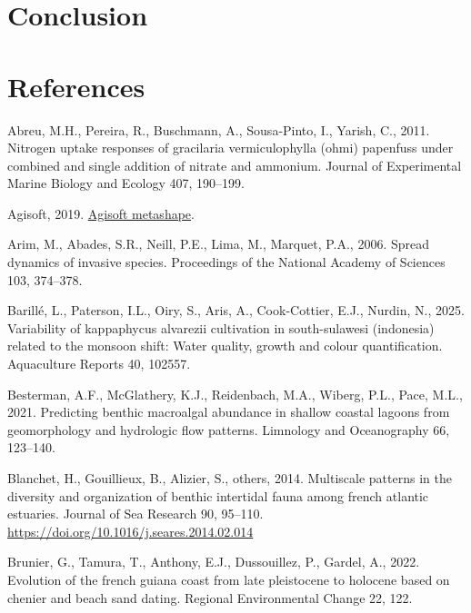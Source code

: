 \documentclass[
  letterpaper,
  DIV=11,
  numbers=noendperiod]{scrartcl}
\newlength{\cslhangindent}
\newenvironment{CSLReferences}[2] %
 {\begin{list}{}{%
  \setlength{\itemindent}{0pt}
  \setlength{\leftmargin}{0pt}
  \setlength{\parsep}{0pt}
  \ifodd #1
   \setlength{\leftmargin}{\cslhangindent}
   \setlength{\itemindent}{-1\cslhangindent}
  \fi
  \setlength{\itemsep}{#2\baselineskip}}}
 {\end{list}}
\begin{document}
\section{Conclusion}\label{conclusion}

\section*{References}\label{references}

\label{refs}
\begin{CSLReferences}{1}{0}
Abreu, M.H., Pereira, R., Buschmann, A., Sousa-Pinto, I., Yarish, C.,
2011. Nitrogen uptake responses of gracilaria vermiculophylla (ohmi)
papenfuss under combined and single addition of nitrate and ammonium.
Journal of Experimental Marine Biology and Ecology 407, 190--199.

Agisoft, 2019. \href{https://www.agisoft.com/}{Agisoft metashape}.

Arim, M., Abades, S.R., Neill, P.E., Lima, M., Marquet, P.A., 2006.
Spread dynamics of invasive species. Proceedings of the National Academy
of Sciences 103, 374--378.

Barillé, L., Paterson, I.L., Oiry, S., Aris, A., Cook-Cottier, E.J.,
Nurdin, N., 2025. Variability of kappaphycus alvarezii cultivation in
south-sulawesi (indonesia) related to the monsoon shift: Water quality,
growth and colour quantification. Aquaculture Reports 40, 102557.

Besterman, A.F., McGlathery, K.J., Reidenbach, M.A., Wiberg, P.L., Pace,
M.L., 2021. Predicting benthic macroalgal abundance in shallow coastal
lagoons from geomorphology and hydrologic flow patterns. Limnology and
Oceanography 66, 123--140.

Blanchet, H., Gouillieux, B., Alizier, S., others, 2014. Multiscale
patterns in the diversity and organization of benthic intertidal fauna
among french atlantic estuaries. Journal of Sea Research 90, 95--110.
\url{https://doi.org/10.1016/j.seares.2014.02.014}

Brunier, G., Tamura, T., Anthony, E.J., Dussouillez, P., Gardel, A.,
2022. Evolution of the french guiana coast from late pleistocene to
holocene based on chenier and beach sand dating. Regional Environmental
Change 22, 122.


\end{CSLReferences}
\end{document}
